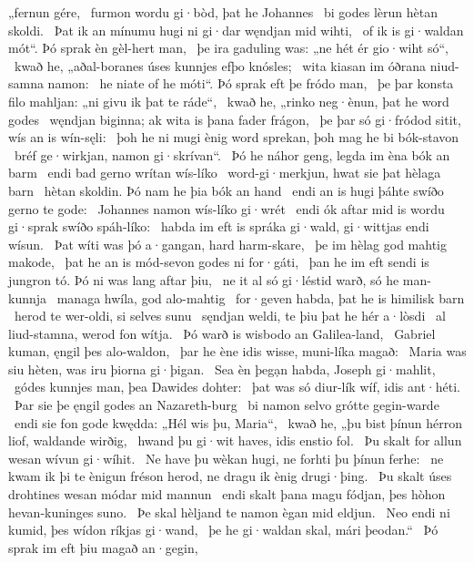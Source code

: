 „fernun gére, \hld\ furmon wordu
gi·bòd, þat he Johannes \hld\ bi godes lèrun
hètan skoldi. \hld\ Þat ik an mínumu hugi ni gi·dar
węndjan mid wihti, \hld\ of ik is gi·waldan mót“.
Þó sprak èn gèl-hert man, \hld\ þe ira gaduling was:
„ne hét ér gio·wiht só“, \hld\ kwað he, „aðal-boranes
úses kunnjes efþo knósles; \hld\ wita kiasan im óðrana
niud-samna namon: \hld\ he niate of he móti“.
Þó sprak eft þe fródo man, \hld\ þe þar konsta filo mahljan:
„ni givu ik þat te ráde“, \hld\ kwað he, „rinko neg·ènun,
þat he word godes \hld\ węndjan biginna;
ak wita is þana fader frágon, \hld\ þe þar só gi·fródod sitit,
wís an is wín-sęli: \hld\ þoh he ni mugi ènig word sprekan,
þoh mag he bi bók-stavon \hld\ bréf ge·wirkjan,
namon gi·skrívan“. \hld\ Þó he náhor geng,
legda im èna bók an barm \hld\ endi bad gerno
wrítan wís-líko \hld\ word-gi·merkjun,
hwat sie þat hèlaga barn \hld\ hètan skoldin.
Þó nam he þia bók an hand \hld\ endi an is hugi þáhte
swíðo gerno te gode: \hld\ Johannes namon
wís-líko gi·wrét \hld\ endi ók aftar mid is wordu gi·sprak
swíðo spáh-líko: \hld\ habda im eft is spráka gi·wald,
gi·wittjas endi wísun. \hld\ Þat wíti was þó a·gangan,
hard harm-skare, \hld\ þe im hèlag god
mahtig makode, \hld\ þat he an is mód-sevon
godes ni for·gáti, \hld\ þan he im eft sendi is jungron tó.
Þó ni was lang aftar þiu, \hld\ ne it al só gi·léstid warð,%
só he man-kunnja \hld\ managa hwíla,
god alo-mahtig \hld\ for·geven habda,
þat he is himilisk barn \hld\ herod te wer-oldi,
si selves sunu \hld\ sęndjan weldi,
te þiu þat he hér a·lòsdi \hld\ al liud-stamna,
werod fon wítja. \hld\ Þó warð is wisbodo
an Galilea-land, \hld\ Gabriel kuman,
ęngil þes alo-waldon, \hld\ þar he ène idis wisse,
muni-líka magað: \hld\ Maria was siu hèten,
was iru þiorna gi·þigan. \hld\ Sea èn þegạn habda,
Joseph gi·mahlit, \hld\ gódes kunnjes man,
þea Dawides dohter: \hld\ þat was só diur-lík wíf,
idis ant·héti. \hld\ Þar sie þe ęngil godes
an Nazareth-burg \hld\ bi namon selvo
grótte gegin-warde \hld\ endi sie fon gode kwędda:
„Hél wis þu, Maria“, \hld\ kwað he, „þu bist þínun hérron liof,
waldande wirðig, \hld\ hwand þu gi·wit haves,
idis enstio fol. \hld\ Þu skalt for allun wesan
wívun gi·wíhit. \hld\ Ne have þu wèkan hugi,
ne forhti þu þínun ferhe: \hld\ ne kwam ik þi te ènigun fréson herod,
ne dragu ik ènig drugi·þing. \hld\ Þu skalt úses drohtines wesan
módar mid mannun \hld\ endi skalt þana magu fódjan,
þes hòhon hevan-kuninges suno. \hld\ Þe skal hèljand te namon
ègan mid eldjun. \hld\ Neo endi ni kumid,
þes wídon ríkjas gi·wand, \hld\ þe he gi·waldan skal,
mári þeodan.“ \hld\ Þó sprak im eft þiu magað an·gegin,
